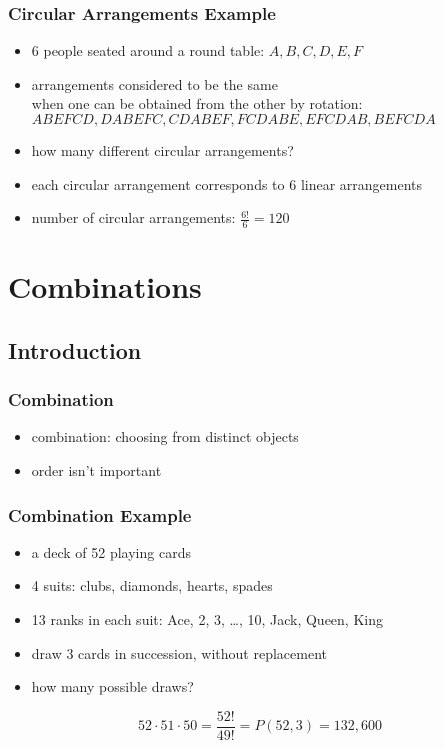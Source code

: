 \documentclass[dvipsnames]{beamer}
\begin{document}

\begin{frame}
  \frametitle{Circular Arrangements Example}

  \begin{itemize}
    \item 6 people seated around a round table: $A,B,C,D,E,F$
    \item arrangements considered to be the same\\
      when one can be obtained from the other by rotation:\\
      \smallskip
      $ABEFCD, DABEFC, CDABEF, FCDABE, EFCDAB, BEFCDA$
    \item how many different circular arrangements?

    \pause
    \medskip
    \item each circular arrangement corresponds to 6 linear arrangements
    \item number of circular arrangements: $\frac{6!}{6} = 120$
  \end{itemize}
\end{frame}

\section{Combinations}

\subsection{Introduction}

\begin{frame}
  \frametitle{Combination}

  \begin{itemize}
    \item \alert{combination}: choosing from distinct objects
    \item order isn't important
  \end{itemize}
\end{frame}

\begin{frame}
  \frametitle{Combination Example}

  \begin{itemize}
    \item a deck of 52 playing cards
    \item 4 suits: clubs, diamonds, hearts, spades
    \item 13 ranks in each suit: Ace, 2, 3, \ldots, 10, Jack, Queen, King
    \item draw 3 cards in succession, without replacement
    \item how many possible draws?
  \end{itemize}

  \pause
  \begin{equation*}
    52 \cdot 51 \cdot 50 = \frac{52!}{49!} = P(52,3) = 132,600
  \end{equation*}
\end{frame}
\end{document}
